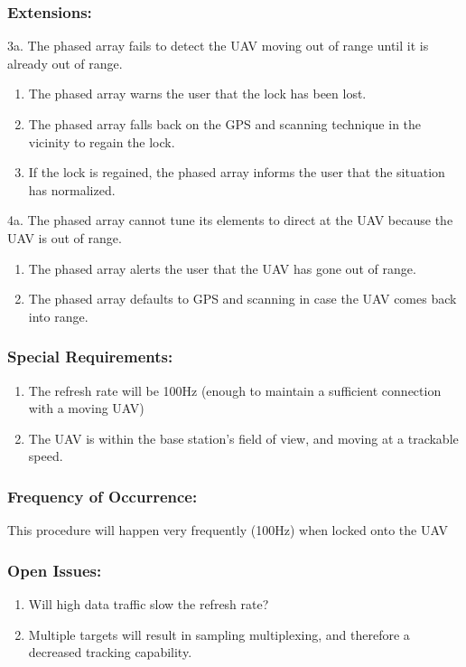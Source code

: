 \documentclass[ProductRequirements.tex]{subfiles}
\begin{document}
	\subsubsection*{Extensions:}
	3a. The phased array fails to detect the UAV moving out of range until it is already out of range.
	\begin{enumerate}
		\item The phased array warns the user that the lock has been lost.
		\item The phased array falls back on the GPS and scanning technique in the vicinity to regain the lock.
		\item If the lock is regained, the phased array informs the user that the situation has normalized.
	\end{enumerate}
	4a. The phased array cannot tune its elements to direct at the UAV because the UAV is out of range.
	\begin{enumerate}
		\item The phased array alerts the user that the UAV has gone out of range.
		\item The phased array defaults to GPS and scanning in case the UAV comes back into range.
	\end{enumerate}
	\subsubsection*{Special Requirements:}
	\begin{enumerate}\itemsep1pt
		\item The refresh rate will be 100Hz (enough to maintain a sufficient connection with a moving UAV)
		\item The UAV is within the base station's field of view, and moving at a trackable speed. 
	\end{enumerate}
	\subsubsection*{Frequency of Occurrence:}
	This procedure will happen very frequently (100Hz) when locked onto the UAV
	\subsubsection*{Open Issues:}
	\begin{enumerate}\itemsep1pt
		\item Will high data traffic slow the refresh rate?
		\item Multiple targets will result in sampling multiplexing, and therefore a decreased tracking capability. 
	\end{enumerate}		
	
\end{document}

